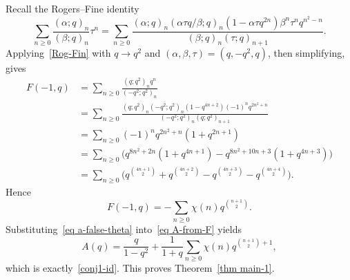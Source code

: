 \documentclass[10pt,a4paper]{amsart}
\numberwithin{equation}{section}
\newcommand{\fr}{\frac}
\begin{document}
Recall the Rogers--Fine identity~\cite[p.223, Eq. (9.1.1)]{Andrews-Berndt 1}
\begin{equation}\label{Rog-Fin}
\sum_{n\geq 0}\fr{(\alpha;q)_n}{(\beta;q)_n}\tau^n
=\sum_{n\geq 0}\fr{(\alpha;q)_n (\alpha\tau q/\beta;q)_n (1-\alpha\tau q^{2n})\beta^n \tau^n q^{n^2-n}}{(\beta;q)_n (\tau ;q)_{n+1}}.
\end{equation}
Applying~\eqref{Rog-Fin} with $q \to q^2$ and $(\alpha,\beta,\tau)=(q,-q^2,q)$, then simplifying, gives
\begin{align*}
F(-1,q)
&=\sum_{n\geq 0}\fr{(q;q^2)_n q^n}{(-q^2;q^2)_n}\\
&=\sum_{n\geq 0}\fr{(q;q^2)_n (-q^2;q^2)_n (1-q^{4n+2})(-1)^n q^{2n^2+n}}{(-q^2;q^2)_n (q;q^2)_{n+1}} \\
&=\sum_{n\geq 0}(-1)^n q^{2n^2+n}(1+q^{2n+1}) \\
&=\sum_{n\geq 0}\Big( q^{8n^2+2n}(1+q^{4n+1})-q^{8n^2+10n+3}(1+q^{4n+3}) \Big) \\
&= \sum_{n\geq 0} \Big( q^{\binom{4n+1}{2}}+q^{\binom{4n+2}{2}}-q^{\binom{4n+3}{2}}-q^{\binom{4n+4}{2}} \Big).
\end{align*}
Hence
\begin{equation}\label{eq a-false-theta}
F(-1,q)=-\sum_{n\geq 0} \chi(n) q^{\binom{n+1}{2}}.
\end{equation}
Substituting~\eqref{eq a-false-theta} into~\eqref{eq A-from-F} yields
\[
A(q)=\fr{q}{1-q^2}+\fr{1}{1+q}\sum_{n\geq 0}\chi(n)q^{\binom{n+1}{2}+1},
\]
which is exactly~\eqref{conj1-id}. This proves Theorem~\ref{thm main-1}.
\end{document}
